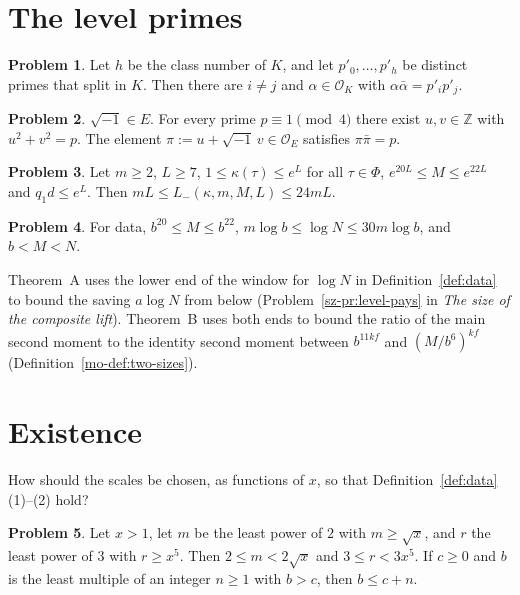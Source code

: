 \documentclass[reqno]{amsart}
\theoremstyle{plain}
\theoremstyle{definition}
\newtheorem{problem}{Problem}[section]
\newcommand{\Z}{{\mathbb{Z}}}
\newcommand{\Oc}{\mathcal O}
\begin{document}
\section{The level primes}\label{sec:level}

\begin{problem}\label{pr:alpha}
Let \(h\) be the class number of \(K\), and let \(p'_0, \dots, p'_h\) be distinct primes that split in \(K\).  Then there are \(i \ne j\) and \(\alpha \in \Oc_K\) with \(\alpha\bar\alpha = p'_i p'_j\).
\end{problem}

\begin{problem}\label{pr:piN}
\(\sqrt{-1} \in E\).  For every prime \(p \equiv 1 \pmod 4\) there exist \(u, v \in \Z\) with \(u^2 + v^2 = p\).  The element \(\pi := u + \sqrt{-1}\, v \in \Oc_E\) satisfies \(\pi\bar\pi = p\).
\end{problem}

\begin{problem}\label{pr:Lminus}
Let \(m \ge 2\), \(L \ge 7\), \(1 \le \kappa(\tau) \le e^L\) for all \(\tau \in \Phi\), \(e^{20L} \le M \le e^{22L}\) and \(q_1 d \le e^L\).  Then \(mL \le L_-(\kappa, m, M, L) \le 24 mL\).
\end{problem}

\begin{problem}\label{pr:MN}
For data, \(b^{20} \le M \le b^{22}\), \(m\log b \le \log N \le 30 m \log b\), and \(b < M < N\).
\end{problem}

Theorem~A uses the lower end of the window for \(\log N\) in Definition~\ref{def:data} to bound the saving \(a\log N\) from below (Problem~\ref{sz-pr:level-pays} in \emph{The size of the composite lift}).  Theorem~B uses both ends to bound the ratio of the main second moment to the identity second moment between \(b^{11kf}\) and \((M/b^6)^{kf}\) (Definition~\ref{mo-def:two-sizes}).

\section{Existence}\label{sec:existence}

How should the scales be chosen, as functions of \(x\), so that Definition~\ref{def:data}(1)--(2) hold?

\begin{problem}\label{pr:least}
Let \(x > 1\), let \(m\) be the least power of \(2\) with \(m \ge \sqrt x\), and \(r\) the least power of \(3\) with \(r \ge x^5\).  Then \(2 \le m < 2\sqrt x\) and \(3 \le r < 3x^5\).  If \(c \ge 0\) and \(b\) is the least multiple of an integer \(n \ge 1\) with \(b > c\), then \(b \le c + n\).
\end{problem}
\end{document}
